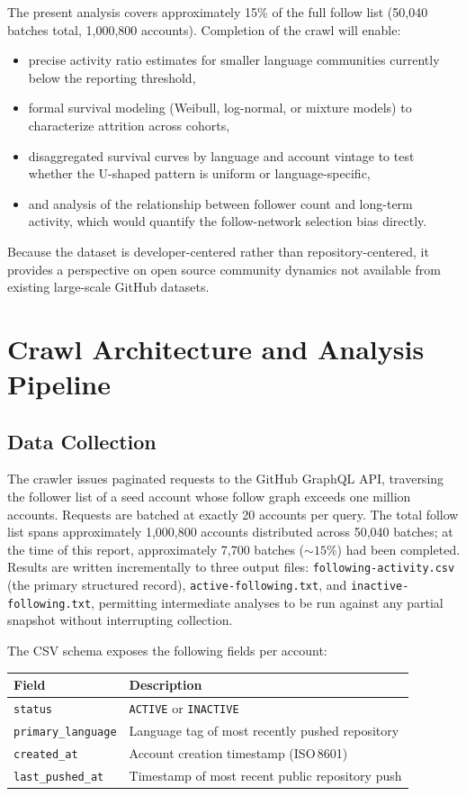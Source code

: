\documentclass[12pt,a4paper]{article}
\begin{document}
The present analysis covers approximately 15\% of the full follow list (50,040
batches total, 1,000,800 accounts). Completion of the crawl will enable:
\begin{itemize}
\item precise activity ratio estimates for smaller language communities currently
      below the reporting threshold,
\item formal survival modeling (Weibull, log-normal, or mixture models) to
      characterize attrition across cohorts,
\item disaggregated survival curves by language and account vintage to test
      whether the U-shaped pattern is uniform or language-specific,
\item and analysis of the relationship between follower count and long-term
      activity, which would quantify the follow-network selection bias directly.
\end{itemize}

Because the dataset is developer-centered rather than repository-centered, it
provides a perspective on open source community dynamics not available from
existing large-scale GitHub datasets.

\section{Crawl Architecture and Analysis Pipeline}

\subsection{Data Collection}

The crawler issues paginated requests to the GitHub GraphQL API, traversing the
follower list of a seed account whose follow graph exceeds one million accounts.
Requests are batched at exactly 20 accounts per query. The total follow list
spans approximately 1,000,800 accounts distributed across 50,040 batches; at the
time of this report, approximately 7,700 batches ($\sim15\%$) had been completed.
Results are written incrementally to three output files:
\texttt{following-activity.csv} (the primary structured record),
\texttt{active-following.txt}, and \texttt{inactive-following.txt}, permitting
intermediate analyses to be run against any partial snapshot without interrupting
collection.

The CSV schema exposes the following fields per account:

\begin{center}
\begin{tabular}{ll}
\toprule
Field & Description \\
\midrule
\texttt{status}            & \texttt{ACTIVE} or \texttt{INACTIVE} \\
\texttt{primary\_language} & Language tag of most recently pushed repository \\
\texttt{created\_at}       & Account creation timestamp (ISO\,8601) \\
\texttt{last\_pushed\_at}  & Timestamp of most recent public repository push \\
\bottomrule
\end{tabular}
\end{center}
\end{document}
